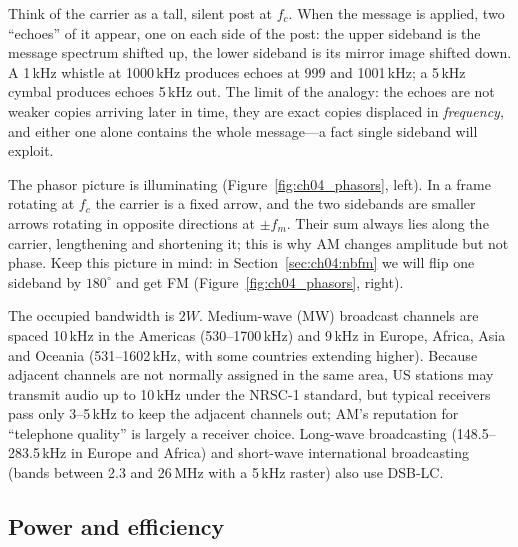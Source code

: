 \begin{analogy}
Think of the carrier as a tall, silent post at $f_c$. When the message is applied, two ``echoes'' of it
appear, one on each side of the post: the upper sideband is the message spectrum shifted up, the lower
sideband is its mirror image shifted down. A 1\,kHz whistle at 1000\,kHz produces echoes at 999 and
1001\,kHz; a 5\,kHz cymbal produces echoes 5\,kHz out. The limit of the analogy: the echoes are not
weaker copies arriving later in time, they are exact copies displaced in \emph{frequency}, and either one
alone contains the whole message---a fact single sideband will exploit.
\end{analogy}

The phasor picture is illuminating (Figure~\ref{fig:ch04_phasors}, left). In a frame rotating at $f_c$
the carrier is a fixed arrow, and the two sidebands are smaller arrows rotating in opposite directions
at $\pm f_m$. Their sum always lies along the carrier, lengthening and shortening it; this is why AM
changes amplitude but not phase. Keep this picture in mind: in Section~\ref{sec:ch04:nbfm} we will flip
one sideband by $180^\circ$ and get FM (Figure~\ref{fig:ch04_phasors}, right).


The occupied bandwidth is $2W$. Medium-wave (MW) broadcast channels are spaced 10\,kHz in the Americas
(530--1700\,kHz) and 9\,kHz in Europe, Africa, Asia and Oceania (531--1602\,kHz, with some countries
extending higher). Because adjacent channels are not normally assigned in the same area, US stations may
transmit audio up to 10\,kHz under the NRSC-1 standard, but typical receivers pass only 3--5\,kHz to keep
the adjacent channels out; AM's reputation for ``telephone quality'' is largely a receiver choice.
Long-wave broadcasting (148.5--283.5\,kHz in Europe and Africa) and short-wave international
broadcasting (bands between 2.3 and 26\,MHz with a 5\,kHz raster) also use DSB-LC.

\subsection{Power and efficiency}
\label{sec:ch04:ampower}

